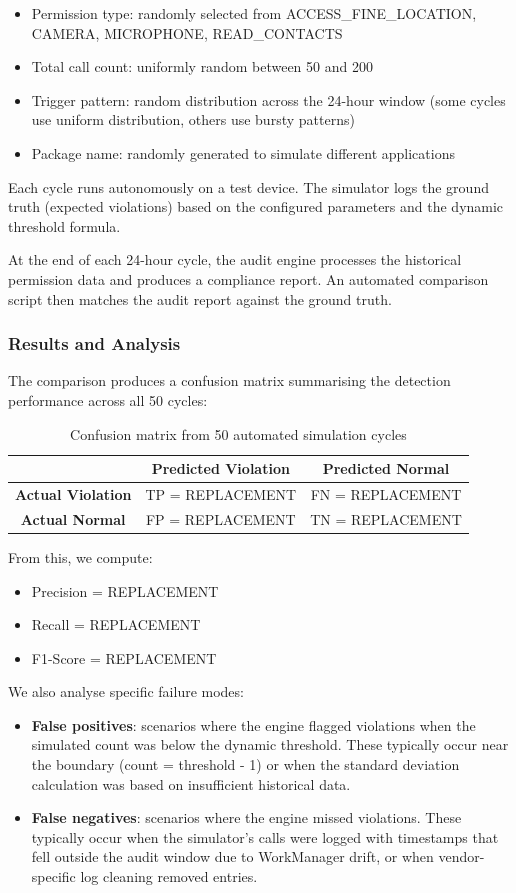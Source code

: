 \begin{itemize}
\item Permission type: randomly selected from {ACCESS\_FINE\_LOCATION, CAMERA, MICROPHONE, READ\_CONTACTS}
\item Total call count: uniformly random between 50 and 200
\item Trigger pattern: random distribution across the 24-hour window (some cycles use uniform distribution, others use bursty patterns)
\item Package name: randomly generated to simulate different applications
\end{itemize}

Each cycle runs autonomously on a test device. The simulator logs the ground truth (expected violations) based on the configured parameters and the dynamic threshold formula.

At the end of each 24-hour cycle, the audit engine processes the historical permission data and produces a compliance report. An automated comparison script then matches the audit report against the ground truth.

\subsubsection{Results and Analysis}
The comparison produces a confusion matrix summarising the detection performance across all 50 cycles:

\begin{table}[H]
\centering
\caption{Confusion matrix from 50 automated simulation cycles}
\begin{tabular}{c|c|c}
\toprule
 & \textbf{Predicted Violation} & \textbf{Predicted Normal} \\
\midrule
\textbf{Actual Violation} & TP = REPLACEMENT & FN = REPLACEMENT \\
\textbf{Actual Normal} & FP = REPLACEMENT & TN = REPLACEMENT \\
\bottomrule
\end{tabular}
\end{table}

From this, we compute:
\begin{itemize}
\item Precision = REPLACEMENT
\item Recall = REPLACEMENT
\item F1-Score = REPLACEMENT
\end{itemize}

We also analyse specific failure modes:
\begin{itemize}
\item \textbf{False positives}: scenarios where the engine flagged violations when the simulated count was below the dynamic threshold. These typically occur near the boundary (count = threshold - 1) or when the standard deviation calculation was based on insufficient historical data.
\item \textbf{False negatives}: scenarios where the engine missed violations. These typically occur when the simulator's calls were logged with timestamps that fell outside the audit window due to WorkManager drift, or when vendor-specific log cleaning removed entries.
\end{itemize}

